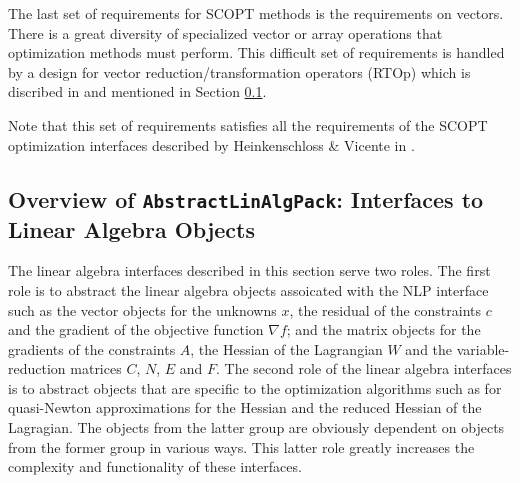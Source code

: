 \documentclass[pdf,ps2pdf,11pt]{SANDreport}
\begin{document}
The last set of requirements for SCOPT methods is the requirements on
vectors.  There is a great diversity of specialized vector or array
operations that optimization methods must perform.  This difficult set
of requirements is handled by a design for vector
reduction/transformation operators (RTOp) which is discribed in
{}\cite{ref:rtop_toms} and mentioned in Section
{}\ref{moocho:sec:ALAP_overview}.

Note that this set of requirements satisfies all the requirements of
the SCOPT optimization interfaces described by Heinkenschloss \&
Vicente in {}\cite{ref:opt_ctrl_itfc}.


%
\subsection{Overview of {}\texttt{AbstractLinAlgPack}: Interfaces to Linear Algebra Objects}
\label{moocho:sec:ALAP_overview}
%

The linear algebra interfaces described in this section serve two roles.  The
first role is to abstract the linear algebra objects assoicated with the NLP
interface such as the vector objects for the unknowns $x$, the residual of the
constraints $c$ and the gradient of the objective function $\nabla f$; and the
matrix objects for the gradients of the constraints $A$, the Hessian of the
Lagrangian $W$ and the variable-reduction matrices $C$, $N$, $E$ and $F$.  The
second role of the linear algebra interfaces is to abstract objects that are
specific to the optimization algorithms such as for quasi-Newton
approximations for the Hessian and the reduced Hessian of the Lagragian.  The
objects from the latter group are obviously dependent on objects from the
former group in various ways.  This latter role greatly increases the
complexity and functionality of these interfaces.
\end{document}
